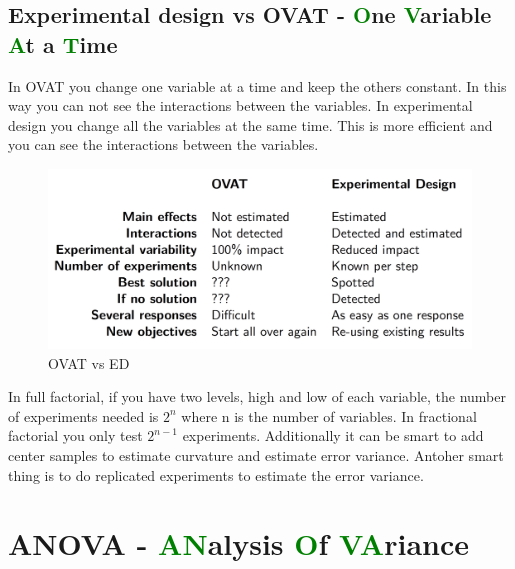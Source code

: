 \subsection{Experimental design vs OVAT - \textcolor{green}{O}ne \textcolor{green}{V}ariable \textcolor{green}{A}t a \textcolor{green}{T}ime}
In OVAT you change one variable at a time and keep the others constant. In this way you can not see the interactions between the variables. In experimental design you change all the variables at the same time. This is more efficient and you can see the interactions between the variables. \newline
\begin{figure}
    \centering
    \includegraphics[width=1\textwidth]{pictures/OVAT_vs_ED.png}
    \caption{OVAT vs ED}
    \label{fig:OVAT_vs_ED}
\end{figure}

In full factorial, if you have two levels, high and low of each variable, the number of experiments needed is $2^n$ where n is the number of variables. \newline
In fractional factorial you only test $2^{n-1}$ experiments. \newline
Additionally it can be smart to add center samples to estimate curvature and estimate error variance. Antoher smart thing is to do replicated experiments to estimate the error variance. \newline

\section{ANOVA - \textcolor{green}{AN}alysis \textcolor{green}{O}f \textcolor{green}{VA}riance}

